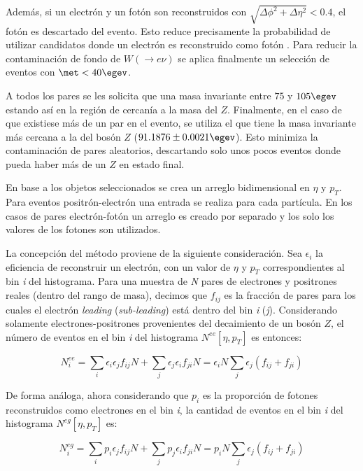 Además, si un electrón y un fotón son reconstruidos con $\sqrt{\Delta\phi^{2}+\Delta\eta^{2}}<0.4$, el fotón es descartado del evento. Esto reduce precisamente la probabilidad de utilizar candidatos donde un electrón es reconstruido como fotón . Para reducir la contaminación de fondo de $W (\rightarrow e\nu)$ se aplica finalmente un selección de eventos con $\met < 40 \egev$. 


A todos los pares se les solicita que una masa invariante entre $75$ y $105 \egev$  estando así en la región de cercanía a la masa del $Z$. Finalmente, en el caso de que existiese más de un par en el evento, se utiliza el que tiene la masa invariante más cercana a la del bosón $Z$ ($91.1876 \pm 0.0021 \egev$\cite{Olive:2016xmw}). Esto minimiza la contaminación de pares aleatorios, descartando solo unos pocos eventos donde pueda haber más de un $Z$ en estado final.


En base a los objetos seleccionados se crea un arreglo bidimensional en  $\eta$ y $p_{T}$. Para eventos positrón-electrón una entrada se realiza para cada partícula. En los casos de pares electrón-fotón un arreglo es creado por separado y los solo los valores de los fotones son utilizados.

La concepción del método proviene de la siguiente consideración. Sea $\epsilon_{i}$ la eficiencia de reconstruir un electrón, con un valor de $\eta$ y $p_{T}$ correspondientes al bin \textit{i} del histograma. Para una muestra de \textit{N} pares de electrones y positrones reales (dentro del rango de masa), decimos que $f_{ij}$ es la fracción de pares para los cuales el electrón \textit{leading} (\textit{sub-leading}) está dentro del bin \textit{i} (\textit{j}). Considerando solamente electrones-positrones provenientes del decaimiento de un bosón $Z$, el número de eventos en el bin \textit{i} del histograma $N^{ee}[\eta , p_{T}]$ es entonces:

\begin{equation}
N_{i}^{ee} = \sum_{i}\epsilon_{i}\epsilon_{j}f_{ij}N + \sum_{j}\epsilon_{j}\epsilon_{i}f_{ji}N = \epsilon_{i}N\sum_{j}\epsilon_{j}(f_{ij}+f_{ji})
\end{equation}

De forma análoga, ahora considerando que $p_{i}$ es la proporción de fotones reconstruidos como electrones en el bin \textit{i}, la cantidad de eventos en el bin \textit{i} del histograma $N^{eg}[\eta , p_{T}]$ es:

\begin{equation}
N_{i}^{eg} = \sum_{i}p_{i}\epsilon_{j}f_{ij}N + \sum_{j}p_{j}\epsilon_{i}f_{ji}N = p_{i}N\sum_{j}\epsilon_{j}(f_{ij}+f_{ji})
\end{equation}


